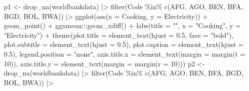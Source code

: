 \documentclass[
  letterpaper,
  DIV=11,
  numbers=noendperiod]{scrreprt}
\newenvironment{Shaded}{\begin{snugshade}}{\end{snugshade}}
\newcommand{\AttributeTok}[1]{\textcolor[rgb]{0.40,0.45,0.13}{#1}}
\newcommand{\DecValTok}[1]{\textcolor[rgb]{0.68,0.00,0.00}{#1}}
\newcommand{\FloatTok}[1]{\textcolor[rgb]{0.68,0.00,0.00}{#1}}
\newcommand{\FunctionTok}[1]{\textcolor[rgb]{0.28,0.35,0.67}{#1}}
\newcommand{\NormalTok}[1]{\textcolor[rgb]{0.00,0.23,0.31}{#1}}
\newcommand{\OtherTok}[1]{\textcolor[rgb]{0.00,0.23,0.31}{#1}}
\newcommand{\SpecialCharTok}[1]{\textcolor[rgb]{0.37,0.37,0.37}{#1}}
\newcommand{\StringTok}[1]{\textcolor[rgb]{0.13,0.47,0.30}{#1}}
\begin{document}
\begin{Shaded}
\begin{Highlighting}[]
\NormalTok{p1 }\OtherTok{\textless{}{-}} \FunctionTok{drop\_na}\NormalTok{(worldbankdata) }\SpecialCharTok{|\textgreater{}}
  \FunctionTok{filter}\NormalTok{(Code }\SpecialCharTok{\%in\%} \FunctionTok{c}\NormalTok{(}\StringTok{\textquotesingle{}AFG\textquotesingle{}}\NormalTok{, }\StringTok{\textquotesingle{}AGO\textquotesingle{}}\NormalTok{, }\StringTok{\textquotesingle{}BEN\textquotesingle{}}\NormalTok{, }\StringTok{\textquotesingle{}BFA\textquotesingle{}}\NormalTok{, }\StringTok{\textquotesingle{}BGD\textquotesingle{}}\NormalTok{, }\StringTok{\textquotesingle{}BOL\textquotesingle{}}\NormalTok{, }\StringTok{\textquotesingle{}BWA\textquotesingle{}}\NormalTok{)) }\SpecialCharTok{|\textgreater{}} 
  \FunctionTok{ggplot}\NormalTok{(}\FunctionTok{aes}\NormalTok{(}\AttributeTok{x =}\NormalTok{ Cooking, }\AttributeTok{y =}\NormalTok{ Electricity)) }\SpecialCharTok{+} \FunctionTok{geom\_point}\NormalTok{() }\SpecialCharTok{+}\NormalTok{ ggxmean}\SpecialCharTok{:::}\FunctionTok{geom\_xdiff}\NormalTok{() }\SpecialCharTok{+}
  \FunctionTok{labs}\NormalTok{(}\AttributeTok{title =} \StringTok{""}\NormalTok{, }\AttributeTok{x =} \StringTok{"Cooking"}\NormalTok{, }\AttributeTok{y =} \StringTok{"Electricity"}\NormalTok{) }\SpecialCharTok{+}
  \FunctionTok{theme}\NormalTok{(}\AttributeTok{plot.title =} \FunctionTok{element\_text}\NormalTok{(}\AttributeTok{hjust =} \FloatTok{0.5}\NormalTok{, }\AttributeTok{face =} \StringTok{"bold"}\NormalTok{),}
        \AttributeTok{plot.subtitle =} \FunctionTok{element\_text}\NormalTok{(}\AttributeTok{hjust =} \FloatTok{0.5}\NormalTok{),}
        \AttributeTok{plot.caption =} \FunctionTok{element\_text}\NormalTok{(}\AttributeTok{hjust =} \FloatTok{0.5}\NormalTok{), }\AttributeTok{legend.position =} \StringTok{"none"}\NormalTok{,}
        \AttributeTok{axis.title.x =} \FunctionTok{element\_text}\NormalTok{(}\AttributeTok{margin =} \FunctionTok{margin}\NormalTok{(}\AttributeTok{t =} \DecValTok{10}\NormalTok{)),}
        \AttributeTok{axis.title.y =} \FunctionTok{element\_text}\NormalTok{(}\AttributeTok{margin =} \FunctionTok{margin}\NormalTok{(}\AttributeTok{r =} \DecValTok{10}\NormalTok{)))}
\NormalTok{p2 }\OtherTok{\textless{}{-}} \FunctionTok{drop\_na}\NormalTok{(worldbankdata) }\SpecialCharTok{|\textgreater{}}
  \FunctionTok{filter}\NormalTok{(Code }\SpecialCharTok{\%in\%} \FunctionTok{c}\NormalTok{(}\StringTok{\textquotesingle{}AFG\textquotesingle{}}\NormalTok{, }\StringTok{\textquotesingle{}AGO\textquotesingle{}}\NormalTok{, }\StringTok{\textquotesingle{}BEN\textquotesingle{}}\NormalTok{, }\StringTok{\textquotesingle{}BFA\textquotesingle{}}\NormalTok{, }\StringTok{\textquotesingle{}BGD\textquotesingle{}}\NormalTok{, }\StringTok{\textquotesingle{}BOL\textquotesingle{}}\NormalTok{, }\StringTok{\textquotesingle{}BWA\textquotesingle{}}\NormalTok{)) }\SpecialCharTok{|\textgreater{}} 

\end{Highlighting}
\end{Shaded}
\end{document}
